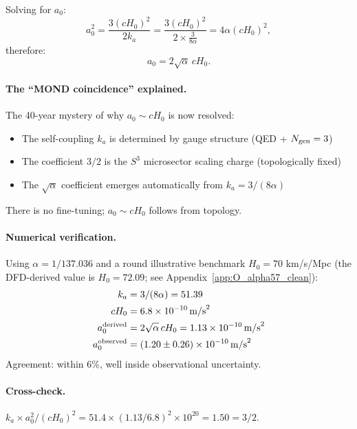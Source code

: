 Solving for $a_0$:
\begin{equation}
a_0^2 = \frac{3(cH_0)^2}{2k_a} = \frac{3(cH_0)^2}{2 \times \frac{3}{8\alpha}} = 4\alpha (cH_0)^2,
\end{equation}
therefore:
\begin{equation}
\boxed{a_0 = 2\sqrt{\alpha}\,cH_0}.
\end{equation}

\paragraph{The ``MOND coincidence'' explained.}
The 40-year mystery of why $a_0 \sim cH_0$ is now resolved:
\begin{itemize}
\item The self-coupling $k_a$ is determined by gauge structure (QED + $N_{\rm gen} = 3$)
\item The coefficient $3/2$ is the $S^3$ microsector scaling charge (topologically fixed)
\item The $\sqrt{\alpha}$ coefficient emerges automatically from $k_a = 3/(8\alpha)$
\end{itemize}

There is no fine-tuning; $a_0 \sim cH_0$ follows from topology.

\paragraph{Numerical verification.}
Using $\alpha = 1/137.036$ and a round illustrative benchmark $H_0 = 70$ km/s/Mpc (the DFD-derived value is $H_0 = 72.09$; see Appendix~\ref{app:O_alpha57_clean}):
\begin{align}
k_a &= 3/(8\alpha) = 51.39 \\
cH_0 &= 6.8 \times 10^{-10}\,\text{m/s}^2 \\
a_0^{\rm derived} &= 2\sqrt{\alpha}\,cH_0 = 1.13 \times 10^{-10}\,\text{m/s}^2 \\
a_0^{\rm observed} &= (1.20 \pm 0.26) \times 10^{-10}\,\text{m/s}^2
\end{align}
Agreement: within 6\%, well inside observational uncertainty.

\paragraph{Cross-check.}
$k_a \times a_0^2 / (cH_0)^2 = 51.4 \times (1.13/6.8)^2 \times 10^{20} = 1.50 = 3/2$. \checkmark

